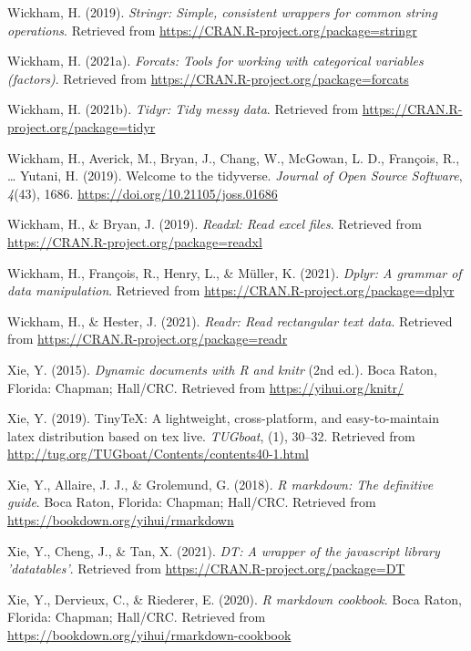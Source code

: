 \documentclass[
  english,
  man]{apa6}
\begin{document}
\leavevmode\hypertarget{ref-R-stringr}{}%
Wickham, H. (2019). \emph{Stringr: Simple, consistent wrappers for common string operations}. Retrieved from \url{https://CRAN.R-project.org/package=stringr}

\leavevmode\hypertarget{ref-R-forcats}{}%
Wickham, H. (2021a). \emph{Forcats: Tools for working with categorical variables (factors)}. Retrieved from \url{https://CRAN.R-project.org/package=forcats}

\leavevmode\hypertarget{ref-R-tidyr}{}%
Wickham, H. (2021b). \emph{Tidyr: Tidy messy data}. Retrieved from \url{https://CRAN.R-project.org/package=tidyr}

\leavevmode\hypertarget{ref-R-tidyverse}{}%
Wickham, H., Averick, M., Bryan, J., Chang, W., McGowan, L. D., François, R., \ldots{} Yutani, H. (2019). Welcome to the tidyverse. \emph{Journal of Open Source Software}, \emph{4}(43), 1686. \url{https://doi.org/10.21105/joss.01686}

\leavevmode\hypertarget{ref-R-readxl}{}%
Wickham, H., \& Bryan, J. (2019). \emph{Readxl: Read excel files}. Retrieved from \url{https://CRAN.R-project.org/package=readxl}

\leavevmode\hypertarget{ref-R-dplyr}{}%
Wickham, H., François, R., Henry, L., \& Müller, K. (2021). \emph{Dplyr: A grammar of data manipulation}. Retrieved from \url{https://CRAN.R-project.org/package=dplyr}

\leavevmode\hypertarget{ref-R-readr}{}%
Wickham, H., \& Hester, J. (2021). \emph{Readr: Read rectangular text data}. Retrieved from \url{https://CRAN.R-project.org/package=readr}

\leavevmode\hypertarget{ref-R-knitr}{}%
Xie, Y. (2015). \emph{Dynamic documents with R and knitr} (2nd ed.). Boca Raton, Florida: Chapman; Hall/CRC. Retrieved from \url{https://yihui.org/knitr/}

\leavevmode\hypertarget{ref-R-tinytex}{}%
Xie, Y. (2019). TinyTeX: A lightweight, cross-platform, and easy-to-maintain latex distribution based on tex live. \emph{TUGboat}, (1), 30--32. Retrieved from \url{http://tug.org/TUGboat/Contents/contents40-1.html}

\leavevmode\hypertarget{ref-R-rmarkdown_a}{}%
Xie, Y., Allaire, J. J., \& Grolemund, G. (2018). \emph{R markdown: The definitive guide}. Boca Raton, Florida: Chapman; Hall/CRC. Retrieved from \url{https://bookdown.org/yihui/rmarkdown}

\leavevmode\hypertarget{ref-R-DT}{}%
Xie, Y., Cheng, J., \& Tan, X. (2021). \emph{DT: A wrapper of the javascript library 'datatables'}. Retrieved from \url{https://CRAN.R-project.org/package=DT}

\leavevmode\hypertarget{ref-R-rmarkdown_b}{}%
Xie, Y., Dervieux, C., \& Riederer, E. (2020). \emph{R markdown cookbook}. Boca Raton, Florida: Chapman; Hall/CRC. Retrieved from \url{https://bookdown.org/yihui/rmarkdown-cookbook}

\endgroup
\end{document}
